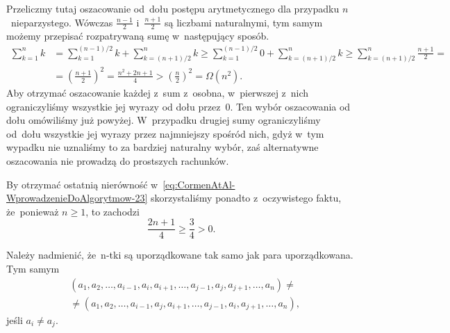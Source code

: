 \documentclass[a4paper,11pt]{article}
\begin{document}
\vspace{\spaceFour}





\noindent
{} Przeliczmy tutaj oszacowanie od~dołu postępu arytmetycznego
dla przypadku $n$~nieparzystego. Wówczas $\frac{ n - 1 }{ 2 }$
i~$\frac{ n + 1 }{ 2 }$ są liczbami naturalnymi, tym samym możemy przepisać
rozpatrywaną sumę w~następujący sposób.
\begin{equation}
  \label{eq:CormenAtAl-WprowadzenieDoAlgorytmow-23}
  \begin{split}
    \sum_{ k = 1 }^{ n } k
    &=
      \sum_{ k = 1 }^{ ( n - 1 ) / 2 } k + \sum_{ k = ( n + 1 ) / 2 }^{ n } k \geq
      \sum_{ k = 1 }^{ ( n - 1 ) / 2 } 0 + \sum_{ k = ( n + 1 ) / 2 }^{ n } k \geq
      \sum_{ k = ( n + 1 ) / 2 }^{ n } \frac{ n + 1 }{ 2 } = \\[0.5em]
    &= \left( \frac{ n + 1 }{ 2 } \right)^{ 2 } =
      \frac{ n^{ 2 } + 2n + 1 }{ 4 } >
      \left( \frac{ n }{ 2 } \right )^{ 2 } = \Omega( n^{ 2 } ).
  \end{split}
\end{equation}
Aby otrzymać oszacowanie każdej z~sum z~osobna, w~pierwszej z~nich
ograniczyliśmy wszystkie jej wyrazy od dołu przez~$0$. Ten wybór oszacowania
od dołu omówiliśmy już powyżej. W~przypadku drugiej sumy ograniczyliśmy
od~dołu wszystkie jej wyrazy przez najmniejszy spośród nich, gdyż w~tym
wypadku nie uznaliśmy to za bardziej naturalny wybór, zaś alternatywne
oszacowania nie prowadzą do prostszych rachunków.

By otrzymać ostatnią nierówność
w~\eqref{eq:CormenAtAl-WprowadzenieDoAlgorytmow-23} skorzystaliśmy ponadto
z~oczywistego faktu, że~ponieważ $n \geq 1$, to zachodzi
\begin{equation}
  \label{eq:CormenAtAl-WprowadzenieDoAlgorytmow-24}
  \frac{ 2n + 1 }{ 4 } \geq \frac{ 3 }{ 4 } > 0.
\end{equation}

\vspace{\spaceFour}





\noindent
{} Należy nadmienić, że~n-tki są uporządkowane tak samo jak para
uporządkowana. Tym samym
\begin{equation}
  \label{eq:CormenAtAl-WprowadzenieDoAlgorytmow-25}
  \begin{split}
    &( a_{ 1 }, a_{ 2 }, \ldots, a_{ i - 1 }, a_{ i }, a_{ i + 1 }, \ldots, a_{ j - 1 },
    a_{ j }, a_{ j + 1 }, \ldots, a_{ n } ) \neq \\
    &\neq ( a_{ 1 }, a_{ 2 }, \ldots, a_{ i - 1 }, a_{ j }, a_{ i + 1 }, \ldots,
    a_{ j - 1 }, a_{ i }, a_{ j + 1 }, \ldots, a_{ n } ),
  \end{split}
\end{equation}
jeśli $a_{ i } \neq a_{ j }$.
\end{document}

